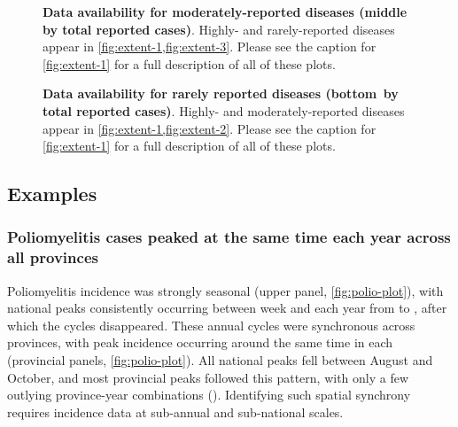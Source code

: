 \documentclass[12pt]{article}
\begin{document}
\newpage



\newpage

\begin{figure}[!ht]
  \caption{\textbf{Data availability for moderately-reported diseases (middle \protect\,by total reported cases)}. Highly- and rarely-reported diseases appear in \cref{fig:extent-1,fig:extent-3}. Please see the caption for \cref{fig:extent-1} for a full description of all of these plots.}
  \label{fig:extent-2}
\end{figure}

\newpage



\newpage

\begin{figure}[!ht]
  \caption{\textbf{Data availability for rarely reported diseases (bottom \protect\,by total reported cases)}. Highly- and moderately-reported diseases appear in \cref{fig:extent-1,fig:extent-2}. Please see the caption for \cref{fig:extent-1} for a full description of all of these plots.}
  \label{fig:extent-3}
\end{figure}

\newpage

\subsection{Examples}\label{sec:illustrative-results}

\subsubsection{Poliomyelitis cases peaked at the same time each year across all provinces}\label{sec:polio-results}

Poliomyelitis incidence was strongly seasonal (upper panel, \cref{fig:polio-plot}), with national peaks consistently occurring between week  and  each year from  to , after which the cycles disappeared. These annual cycles were synchronous across provinces, with peak incidence occurring around the same time in each (provincial panels, \cref{fig:polio-plot}). All national peaks fell between August and October, and most provincial peaks followed this pattern, with only a few outlying province-year combinations (). Identifying such spatial synchrony requires incidence data at sub-annual and sub-national scales.
\end{document}
